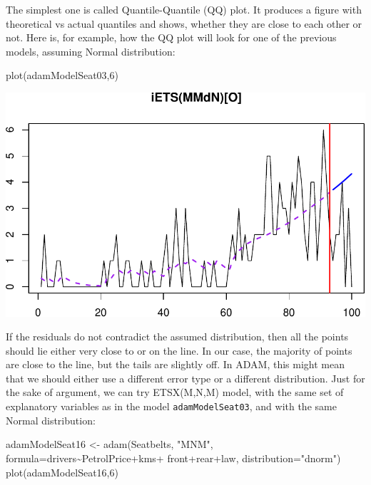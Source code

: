 \documentclass[
]{book}
\newenvironment{Shaded}{\begin{snugshade}}{\end{snugshade}}
\newcommand{\AttributeTok}[1]{\textcolor[rgb]{0.77,0.63,0.00}{#1}}
\newcommand{\DecValTok}[1]{\textcolor[rgb]{0.00,0.00,0.81}{#1}}
\newcommand{\FunctionTok}[1]{\textcolor[rgb]{0.00,0.00,0.00}{#1}}
\newcommand{\NormalTok}[1]{#1}
\newcommand{\OtherTok}[1]{\textcolor[rgb]{0.56,0.35,0.01}{#1}}
\newcommand{\SpecialCharTok}[1]{\textcolor[rgb]{0.00,0.00,0.00}{#1}}
\newcommand{\StringTok}[1]{\textcolor[rgb]{0.31,0.60,0.02}{#1}}
\theoremstyle{definition}
\theoremstyle{definition}
\theoremstyle{definition}
\theoremstyle{definition}
\theoremstyle{remark}
\begin{document}
The simplest one is called Quantile-Quantile (QQ) plot. It produces a figure with theoretical vs actual quantiles and shows, whether they are close to each other or not. Here is, for example, how the QQ plot will look for one of the previous models, assuming Normal distribution:

\begin{Shaded}
\begin{Highlighting}[]
\FunctionTok{plot}\NormalTok{(adamModelSeat03,}\DecValTok{6}\NormalTok{)}
\end{Highlighting}
\end{Shaded}

\includegraphics{adam_files/figure-latex/unnamed-chunk-167-1.pdf}

If the residuals do not contradict the assumed distribution, then all the points should lie either very close to or on the line. In our case, the majority of points are close to the line, but the tails are slightly off. In ADAM, this might mean that we should either use a different error type or a different distribution. Just for the sake of argument, we can try ETSX(M,N,M) model, with the same set of explanatory variables as in the model \texttt{adamModelSeat03}, and with the same Normal distribution:

\begin{Shaded}
\begin{Highlighting}[]
\NormalTok{adamModelSeat16 }\OtherTok{\textless{}{-}} \FunctionTok{adam}\NormalTok{(Seatbelts, }\StringTok{"MNM"}\NormalTok{,}
                        \AttributeTok{formula=}\NormalTok{drivers}\SpecialCharTok{\textasciitilde{}}\NormalTok{PetrolPrice}\SpecialCharTok{+}\NormalTok{kms}\SpecialCharTok{+}
\NormalTok{                          front}\SpecialCharTok{+}\NormalTok{rear}\SpecialCharTok{+}\NormalTok{law,}
                        \AttributeTok{distribution=}\StringTok{"dnorm"}\NormalTok{)}
\FunctionTok{plot}\NormalTok{(adamModelSeat16,}\DecValTok{6}\NormalTok{)}
\end{Highlighting}
\end{Shaded}
\end{document}
